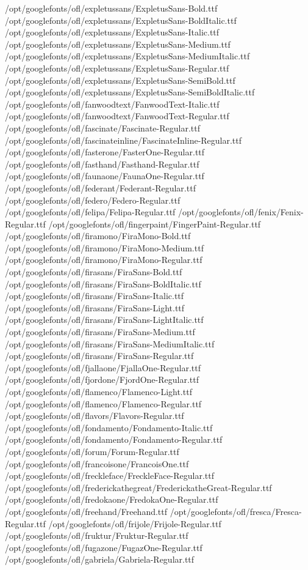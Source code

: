 /opt/googlefonts/ofl/expletussans/ExpletusSans-Bold.ttf
/opt/googlefonts/ofl/expletussans/ExpletusSans-BoldItalic.ttf
/opt/googlefonts/ofl/expletussans/ExpletusSans-Italic.ttf
/opt/googlefonts/ofl/expletussans/ExpletusSans-Medium.ttf
/opt/googlefonts/ofl/expletussans/ExpletusSans-MediumItalic.ttf
/opt/googlefonts/ofl/expletussans/ExpletusSans-Regular.ttf
/opt/googlefonts/ofl/expletussans/ExpletusSans-SemiBold.ttf
/opt/googlefonts/ofl/expletussans/ExpletusSans-SemiBoldItalic.ttf
/opt/googlefonts/ofl/fanwoodtext/FanwoodText-Italic.ttf
/opt/googlefonts/ofl/fanwoodtext/FanwoodText-Regular.ttf
/opt/googlefonts/ofl/fascinate/Fascinate-Regular.ttf
/opt/googlefonts/ofl/fascinateinline/FascinateInline-Regular.ttf
/opt/googlefonts/ofl/fasterone/FasterOne-Regular.ttf
/opt/googlefonts/ofl/fasthand/Fasthand-Regular.ttf
/opt/googlefonts/ofl/faunaone/FaunaOne-Regular.ttf
/opt/googlefonts/ofl/federant/Federant-Regular.ttf
/opt/googlefonts/ofl/federo/Federo-Regular.ttf
/opt/googlefonts/ofl/felipa/Felipa-Regular.ttf
/opt/googlefonts/ofl/fenix/Fenix-Regular.ttf
/opt/googlefonts/ofl/fingerpaint/FingerPaint-Regular.ttf
/opt/googlefonts/ofl/firamono/FiraMono-Bold.ttf
/opt/googlefonts/ofl/firamono/FiraMono-Medium.ttf
/opt/googlefonts/ofl/firamono/FiraMono-Regular.ttf
/opt/googlefonts/ofl/firasans/FiraSans-Bold.ttf
/opt/googlefonts/ofl/firasans/FiraSans-BoldItalic.ttf
/opt/googlefonts/ofl/firasans/FiraSans-Italic.ttf
/opt/googlefonts/ofl/firasans/FiraSans-Light.ttf
/opt/googlefonts/ofl/firasans/FiraSans-LightItalic.ttf
/opt/googlefonts/ofl/firasans/FiraSans-Medium.ttf
/opt/googlefonts/ofl/firasans/FiraSans-MediumItalic.ttf
/opt/googlefonts/ofl/firasans/FiraSans-Regular.ttf
/opt/googlefonts/ofl/fjallaone/FjallaOne-Regular.ttf
/opt/googlefonts/ofl/fjordone/FjordOne-Regular.ttf
/opt/googlefonts/ofl/flamenco/Flamenco-Light.ttf
/opt/googlefonts/ofl/flamenco/Flamenco-Regular.ttf
/opt/googlefonts/ofl/flavors/Flavors-Regular.ttf
/opt/googlefonts/ofl/fondamento/Fondamento-Italic.ttf
/opt/googlefonts/ofl/fondamento/Fondamento-Regular.ttf
/opt/googlefonts/ofl/forum/Forum-Regular.ttf
/opt/googlefonts/ofl/francoisone/FrancoisOne.ttf
/opt/googlefonts/ofl/freckleface/FreckleFace-Regular.ttf
/opt/googlefonts/ofl/frederickathegreat/FrederickatheGreat-Regular.ttf
/opt/googlefonts/ofl/fredokaone/FredokaOne-Regular.ttf
/opt/googlefonts/ofl/freehand/Freehand.ttf
/opt/googlefonts/ofl/fresca/Fresca-Regular.ttf
/opt/googlefonts/ofl/frijole/Frijole-Regular.ttf
/opt/googlefonts/ofl/fruktur/Fruktur-Regular.ttf
/opt/googlefonts/ofl/fugazone/FugazOne-Regular.ttf
/opt/googlefonts/ofl/gabriela/Gabriela-Regular.ttf
